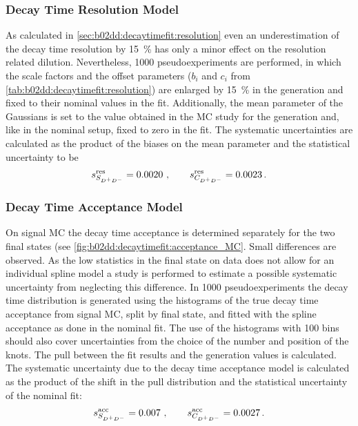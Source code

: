 \subsubsection{Decay Time Resolution Model}
\label{sec:systematics:decaytimeresolution}

As calculated in \cref{sec:b02dd:decaytimefit:resolution} even an
underestimation of the decay time resolution by \SI{15}{\percent} has only a
minor effect on the resolution related dilution. Nevertheless, \num{1000}
pseudoexperiments are performed, in which the scale factors and the offset
parameters ($b_i$ and $c_i$ from \cref{tab:b02dd:decaytimefit:resolution}) are
enlarged by \SI{15}{\percent} in the generation and fixed to their nominal
values in the fit. Additionally, the mean parameter of the Gaussians is set to
the value obtained in the MC study for the generation and, like in the nominal
setup, fixed to zero in the fit. The systematic uncertainties are calculated
as the product of the biases on the mean parameter and the statistical
uncertainty to be
\begin{align*}
s_{S_{{{D}^+}{{D}^-}}}^{\text{res}} = \num{0.0020}\ , \qquad s_{C_{{{D}^+}{{D}^-}}}^{\text{res}} = \num{0.0023}\,.
\end{align*}

\subsubsection{Decay Time Acceptance Model}
\label{sec:systematics:decaytimeacceptance}

On signal MC the decay time acceptance is determined separately for the two
final states (see \cref{fig:b02dd:decaytimefit:acceptance_MC}. Small
differences are observed. As the low statistics in the \KKpiKpipi final state
on data does not allow for an individual spline model a study is performed to
estimate a possible systematic uncertainty from neglecting this difference. In
\num{1000} pseudoexperiments the decay time distribution is generated using
the histograms of the true decay time acceptance from signal MC, split by
final state, and fitted with the spline acceptance as done in the nominal fit.
The use of the histograms with \num{100} bins should also cover uncertainties
from the choice of the number and position of the knots. The pull between the
fit results and the generation values is calculated. The systematic
uncertainty due to the decay time acceptance model is calculated as the
product of the shift in the pull distribution and the statistical uncertainty
of the nominal fit:
\begin{align*}
s_{S_{{{D}^+}{{D}^-}}}^{\textrm{acc}} = \num{0.007}\ , \qquad s_{C_{{{D}^+}{{D}^-}}}^{\textrm{acc}} = \num{0.0027}\,.
\end{align*}
